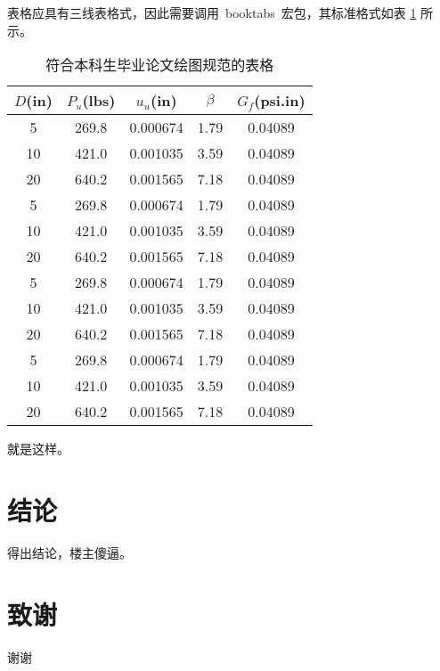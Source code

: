表格应具有三线表格式，因此需要调用~booktabs~宏包，其标准格式如表 \ref{tab:table1} 所示。
\begin{table}[htbp]
\caption{符合本科生毕业论文绘图规范的表格}\label{tab:table1}
\vspace{0.5em}\centering\wuhao
\begin{tabular}{ccccc}
\toprule[1.5pt]
$D$(in) & $P_u$(lbs) & $u_u$(in) & $\beta$ & $G_f$(psi.in)\\
\midrule[1pt]
 5 & 269.8 & 0.000674 & 1.79 & 0.04089\\
10 & 421.0 & 0.001035 & 3.59 & 0.04089\\
20 & 640.2 & 0.001565 & 7.18 & 0.04089\\
 5 & 269.8 & 0.000674 & 1.79 & 0.04089\\
10 & 421.0 & 0.001035 & 3.59 & 0.04089\\
20 & 640.2 & 0.001565 & 7.18 & 0.04089\\
 5 & 269.8 & 0.000674 & 1.79 & 0.04089\\
10 & 421.0 & 0.001035 & 3.59 & 0.04089\\
20 & 640.2 & 0.001565 & 7.18 & 0.04089\\
 5 & 269.8 & 0.000674 & 1.79 & 0.04089\\
10 & 421.0 & 0.001035 & 3.59 & 0.04089\\
20 & 640.2 & 0.001565 & 7.18 & 0.04089\\
\bottomrule[1.5pt]
\end{tabular}
\vspace{\baselineskip}
\end{table}

就是这样。





\chapter*{结\quad 论}

得出结论，楼主傻逼。


\chapter*{致\quad 谢}

谢谢
